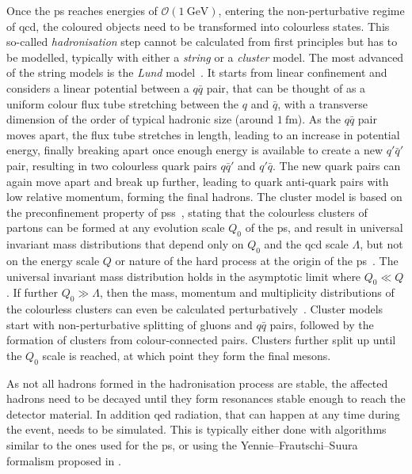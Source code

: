 Once the \gls{ps} reaches energies of $\mathcal{O}(\SI{1}{\GeV})$, entering the non-perturbative regime of \gls{qcd}, the coloured objects need to be transformed into colourless states. This so-called \textit{hadronisation} step cannot be calculated from first principles but has to be modelled, typically with either a \textit{string} or a \textit{cluster} model. The most advanced of the string models is the \textit{Lund} model~\cite{Andersson:1983ia,andersson_1998}. It starts from linear confinement and considers a linear potential between a $q\bar{q}$ pair, that can be thought of as a uniform colour flux tube stretching between the $q$ and $\bar{q}$, with a transverse dimension of the order of typical hadronic size (\ie around $\SI{1}{\femto\meter}$). As the $q\bar{q}$ pair moves apart, the flux tube stretches in length, leading to an increase in potential energy, finally breaking apart once enough energy is available to create a new $q'\bar{q}'$ pair, resulting in two colourless quark pairs $q\bar{q}'$ and $q'\bar{q}$. The new quark pairs can again move apart and break up further, leading to quark anti-quark pairs with low relative momentum, forming the final hadrons. The cluster model is based on the preconfinement property of \glspl{ps}~\cite{Amati:1979fg}, stating that the colourless clusters of partons can be formed at any evolution scale $Q_0$ of the \gls{ps}, and result in universal invariant mass distributions that depend only on $Q_0$ and the \gls{qcd} scale $\Lambda$, but not on the energy scale $Q$ or nature of the hard process at the origin of the \gls{ps}~\cite{Buckley:2011ms}. The universal invariant mass distribution holds in the asymptotic limit where $Q_0 \ll Q$. If further $Q_0 \gg \Lambda$, then the mass, momentum and multiplicity distributions of the colourless clusters can even be calculated perturbatively~\cite{Buckley:2011ms}. Cluster models start with non-perturbative splitting of gluons and $q\bar{q}$ pairs, followed by the formation of clusters from colour-connected pairs. Clusters further split up until the $Q_0$ scale is reached, at which point they form the final mesons.

 As not all hadrons formed in the hadronisation process are stable, the affected hadrons need to be decayed until they form resonances stable enough to reach the detector material. In addition \gls{qed} radiation, that can happen at any time during the event, needs to be simulated. This is typically either done with algorithms similar to the ones used for the \gls{ps}, or using the Yennie--Frautschi--Suura formalism proposed in \cite{YENNIE1961379}.
 
